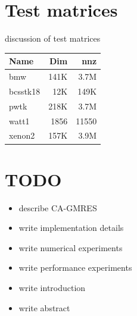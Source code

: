 \documentclass{scrartcl}
\numberwithin{equation}{section}
\begin{document}
\begin{appendices}
\section{Test matrices}
discussion of test matrices \\

\begin{tabular}{l|r|r}
Name & Dim & nnz \\
\hline
bmw & 141K & 3.7M \\
bcsstk18 & 12K & 149K \\
pwtk & 218K & 3.7M \\
watt1 & 1856 & 11550 \\
xenon2 & 157K & 3.9M
\end{tabular}

\section{TODO}
\begin{itemize}
\item describe CA-GMRES
\item write implementation details
\item write numerical experiments
\item write performance experiments
\item write introduction
\item write abstract
\end{itemize}
\end{appendices}
\end{document}
